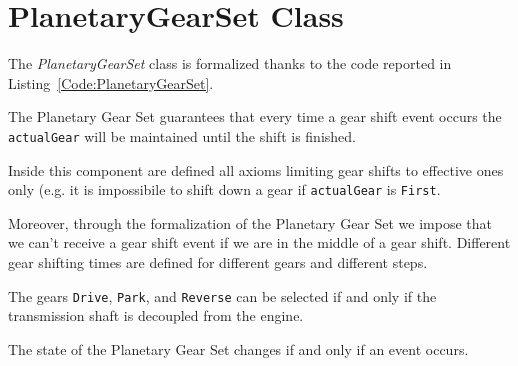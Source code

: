 \section{PlanetaryGearSet Class}
\label{Section:PlanetaryGearSet}
The \emph{PlanetaryGearSet} class is formalized thanks to the code reported in Listing~\ref{Code:PlanetaryGearSet}.

The Planetary Gear Set guarantees that every time a gear shift event occurs the \texttt{actualGear} will be maintained until the shift is finished.

Inside this component are defined all axioms limiting gear shifts to effective ones only (e.g. it is impossibile to shift down a gear if \texttt{actualGear} is \texttt{First}.

Moreover, through the formalization of the Planetary Gear Set we impose that we can't receive a gear shift event if we are in the middle of a gear shift. Different gear shifting times are defined for different gears and different steps.

The gears \texttt{Drive}, \texttt{Park}, and \texttt{Reverse} can be selected if and only if the transmission shaft is decoupled from the engine.

The state of the Planetary Gear Set changes if and only if an event occurs.


